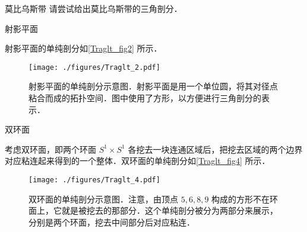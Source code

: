 \begin{exercise}{莫比乌斯带}
请尝试给出莫比乌斯带的三角剖分．
\end{exercise}


\begin{example}{射影平面}

射影平面的单纯剖分如\autoref{Traglt_fig2} 所示．

\begin{figure}[ht]
\centering
\texttt{[image: ./figures/Traglt\_2.pdf]}
\caption{射影平面的单纯剖分示意图．射影平面是用一个单位圆，将其对径点粘合而成的拓扑空间．图中使用了方形，以方便进行三角剖分的表示．} \label{Traglt_fig2}
\end{figure}

\end{example}

\begin{example}{双环面}

考虑双环面，即两个环面 $S^1\times S^1$ 各挖去一块连通区域后，把挖去区域的两个边界对应粘连起来得到的一个整体．双环面的单纯剖分如\autoref{Traglt_fig4} 所示．

\begin{figure}[ht]
\centering
\texttt{[image: ./figures/Traglt\_4.pdf]}
\caption{双环面的单纯剖分示意图．注意，由顶点 $5, 6, 8, 9$ 构成的方形不在环面上，它就是被挖去的那部分．这个单纯剖分被分为两部分来展示，分别是两个环面，挖去中间部分后对应粘连．} \label{Traglt_fig4}
\end{figure}


\end{example}






